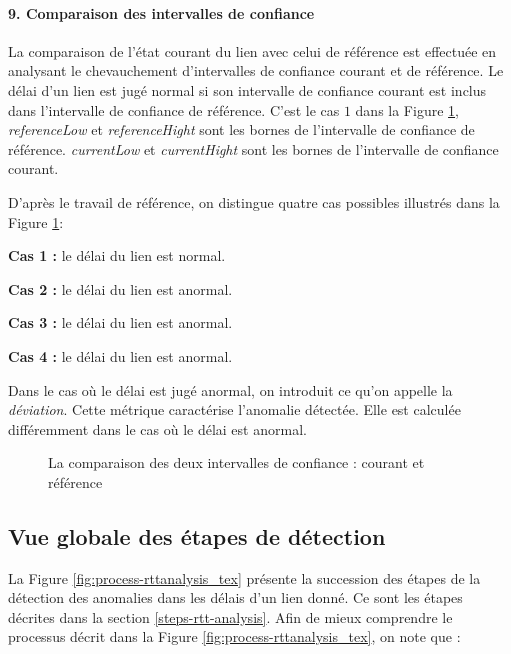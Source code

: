  \paragraph{9. Comparaison des intervalles de confiance} 

La comparaison de l'état courant du lien avec celui de référence est effectuée en analysant le chevauchement d'intervalles de confiance  courant et de référence. Le délai d'un lien est jugé normal si son intervalle de confiance courant est inclus dans l'intervalle de confiance de référence. C'est le cas $1$ dans la Figure 	\ref{fig:intervals-comparaison},  \textit{referenceLow} et \textit{referenceHight} sont les bornes de l'intervalle de confiance de référence.  \textit{currentLow} et \textit{currentHight} sont les bornes de l'intervalle de confiance courant.

D'après le travail de référence, on distingue quatre cas possibles  illustrés dans la Figure 	\ref{fig:intervals-comparaison}:

\textbf{Cas 1 :} le délai du lien est normal.

\textbf{Cas 2 :} le délai du lien est anormal.

\textbf{Cas 3 :} le délai du lien est anormal.

\textbf{Cas 4 :} le délai du lien est anormal.

Dans le cas où le délai est jugé anormal, on introduit ce qu'on appelle la \textit{déviation}. Cette métrique caractérise l'anomalie détectée. Elle est calculée différemment dans le cas où le délai est anormal.

\begin{figure}[H]
	\centering
	\captionsetup{justification=centering}
	\resizebox{\textwidth}{!}{
		
	}
	\caption{La comparaison des deux intervalles de confiance : courant et référence }
	\label{fig:intervals-comparaison}
\end{figure}



\subsection{Vue globale des étapes de  détection}
La Figure 	\ref{fig:process-rttanalysis_tex} présente la succession des étapes de la détection des anomalies dans les délais d'un lien donné. Ce sont les étapes décrites dans la section \ref{steps-rtt-analysis}.  Afin de mieux comprendre le processus décrit dans la Figure \ref{fig:process-rttanalysis_tex}, on note que :


